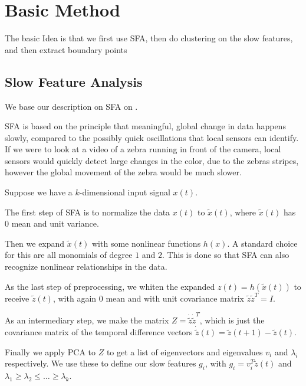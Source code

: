 \section{Basic Method}
The basic Idea is that we first use SFA, then do clustering on the slow features, and then extract boundary points
\subsection{Slow Feature Analysis}
We base our description on SFA on .

SFA is based on the principle that meaningful, global change in data happens slowly, compared to the possibly quick oscillations that local sensors can identify. If we were to look at a video of a zebra running in front of the camera, local sensors would quickly detect large changes in the color, due to the zebras stripes, however the global movement of the zebra would be much slower.


Suppose we have a $k$-dimensional input signal $x(t)$.

The first step of SFA is to normalize the data $x(t)$ to $\tilde{x}(t)$, where $\tilde{x}(t)$ has $0$ mean and unit variance.

Then we expand $\tilde{x}(t)$ with some nonlinear functions $h(x)$. A standard choice for this are all monomials of degree $1$ and $2$. This is done so that SFA can also recognize nonlinear relationships in the data.

As the last step of preprocessing, we whiten the expanded $z(t)=h(\tilde{x}(t))$ to receive $\tilde{z}(t)$, with again $0$ mean and with unit covariance matrix $\tilde{z}\tilde{z}^T=I$. 

As an intermediary step, we make the matrix $Z=\dot{\tilde{z}}\dot{\tilde{z}}^T$, which is just the covariance matrix of the temporal difference vectors $\dot{\tilde{z}}(t)=\tilde{z}(t+1)-\tilde{z}(t)$.

Finally we apply PCA  to $Z$ to get a list of eigenvectors and eigenvalues $v_i$ and $\lambda_i$ respectively. We use these to define our slow features $g_i$, with $g_i=v_i^T\tilde{z}(t)$ and $\lambda_1 \geq \lambda _2 \leq \ldots \geq \lambda_k$. 

